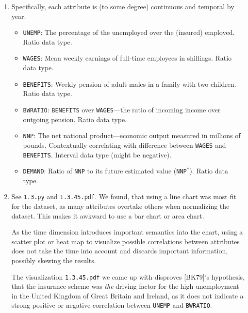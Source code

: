     \begin{exercise} \hfill
        \begin{enumerate}
            \item Specifically, each attribute is (to some degree) continuous and temporal by year. %
            \begin{itemize}
                \item \lstinline|UNEMP|: The percentage of the unemployed over the (insured) employed. Ratio data type.
                \item \lstinline|WAGES|: Mean weekly earnings of full-time employees in shillings. Ratio data type.
                \item \lstinline|BENEFITS|: Weekly pension of adult males in a family with two children. Ratio data type.
                \item \lstinline|BWRATIO|: \lstinline|BENEFITS| over \lstinline|WAGES|---the ratio of incoming income over outgoing pension. Ratio data type.
                \item \lstinline|NNP|: The net national product---economic output measured in millions of pounds. Contextually correlating with difference between \lstinline|WAGES| and \lstinline|BENEFITS|. Interval data type (might be negative).
                \item \lstinline|DEMAND|: Ratio of \lstinline|NNP| to its future estimated value (\lstinline|NNP|\(^*\)). Ratio data type.
            \end{itemize}
            \item[2. 3. 4. 5.] See \lstinline|1.3.py| and \lstinline|1.3.45.pdf|.
            We found, that using a line chart was most fit for the dataset, as many attributes overtake others when normalizing the dataset.
            This makes it awkward to use a bar chart or area chart.
            
            As the time dimension introduces important semantics into the chart, using a scatter plot or heat map to visualize possible correlations between attributes does not take the time into account and discards important information, possibly skewing the results.

            The visualization \lstinline|1.3.45.pdf| we came up with disproves [BK79]'s hypothesis, that the insurance scheme was \emph{the} driving factor for the high unemployment in the United Kingdom of Great Britain and Ireland, as it does not indicate a strong positive or negative correlation between \lstinline|UNEMP| and \lstinline|BWRATIO|.
            \setcounter{enumi}{5}


\end{enumerate}
\end{exercise}
